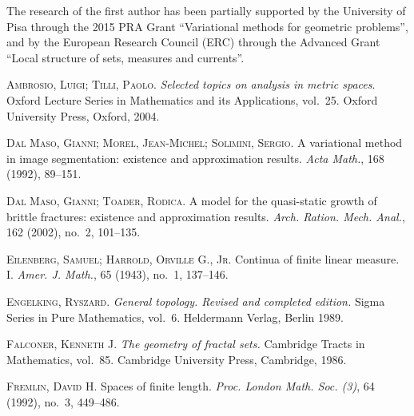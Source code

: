 \documentclass[11pt,reqno,a4paper,final]{amsart}
\numberwithin{equation}{section}
\theoremstyle{mytheorem}
\theoremstyle{myremark}
\theoremstyle{myparagraph}
\begin{document}
The research of the first author has been partially supported by 
the University of Pisa through the 2015 PRA Grant
``Variational methods for geometric problems'',   
and by the European Research Council (ERC) through the 
Advanced Grant ``Local structure of sets, measures and currents''.

\begin{thebibliography}{10}
\setlength{\itemsep}{3pt}
\newcommand{\aut}[1]{\textsc{#1}}

\aut{Ambrosio, Luigi; Tilli, Paolo.}
\textit{Selected topics on analysis in metric spaces}.
Oxford Lecture Series in Mathematics and its Applications, vol.~25.
Oxford University Press, Oxford, 2004.



\aut{Dal Maso, Gianni; Morel, Jean-Michel; Solimini, Sergio.} 
A variational method in image segmentation: existence and approximation results. 
\textit{Acta Math.}, 168 (1992), 89--151.

\aut{Dal Maso, Gianni; Toader, Rodica.}
A model for the quasi-static growth of brittle fractures: 
existence and approximation results. 
\textit{Arch. Ration. Mech. Anal.}, 162 (2002), no.~2, 101--135. 

\aut{Eilenberg, Samuel; Harrold, Orville G., Jr.}
Continua of finite linear measure. I.
\textit{Amer. J. Math.}, 65 (1943), no.~1, 137--146. 

\aut{Engelking, Ryszard.}
\textit{General topology. Revised and completed edition.} 
Sigma Series in Pure Mathematics, vol.~6.
Heldermann Verlag, Berlin 1989.

\aut{Falconer, Kenneth J.}
\textit{The geometry of fractal sets.}
Cambridge Tracts in Mathematics, vol.~85.
Cambridge University Press, Cambridge, 1986.

\aut{Fremlin, David H.}
Spaces of finite length.
\textit{Proc. London Math. Soc. (3)},
64 (1992), no.~3, 449--486. 


\end{thebibliography}
\end{document}
